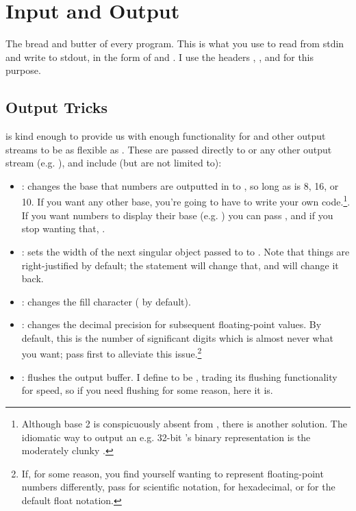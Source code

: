 \documentclass[../main]{subfiles}
\begin{document}
\section{Input and Output}

\par
The bread and butter of every program. This is what you use to read from stdin and write to stdout, in the form of  and . I use the headers , , and  for this purpose. 

\subsection{Output Tricks}

\par
{} is kind enough to provide us with enough functionality for  and other output streams to be as flexible as . These are passed directly to  or any other output stream (e.g. ), and include (but are not limited to):

\begin{itemize}
	\item {}: changes the base that numbers are outputted in to , so long as  is 8, 16, or 10. If you want any other base, you're going to have to write your own code.\footnote{Although base 2 is conspicuously absent from , there is another solution. The idiomatic way to output an e.g. 32-bit 's binary representation is the moderately clunky .}. If you want numbers to display their base (e.g. ) you can pass , and if you stop wanting that, .
	      
	\item {}: sets the width of the next singular object passed to  to . Note that things are right-justified by default; the statement  will change that, and  will change it back.
	      
	\item {}: changes the fill character ( by default).
	      
	\item {}: changes the decimal precision for subsequent floating-point values. By default, this is the number of significant digits which is almost never what you want; pass  first to alleviate this issue.\footnote{If, for some reason, you find yourself wanting to represent floating-point numbers differently, pass  for scientific notation,  for hexadecimal, or  for the default float notation.}
	      
	\item {}: flushes the output buffer. I define  to be , trading its flushing functionality for speed, so if you need flushing for some reason, here it is.
\end{itemize}
\end{document}
